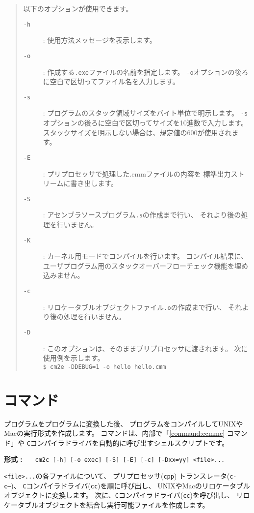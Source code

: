 \begin{quote}
\hspace{-1em}以下のオプションが使用できます。

\begin{description}
\item[{\tt -h}] : 使用方法メッセージを表示します。
\item[{\tt -o}] : 作成する{\tt .exe}ファイルの名前を指定します。
{\tt -o}オプションの後ろに空白で区切ってファイル名を入力します。
\item[{\tt -s}] : プログラムのスタック領域サイズをバイト単位で明示します。
{\tt -s}オプションの後ろに空白で区切ってサイズを10進数で入力します。
スタックサイズを明示しない場合は、規定値の600が使用されます。
\item[{\tt -E}] : プリプロセッサで処理した{.cmm}ファイルの内容を
標準出力ストリームに書き出します。
\item[{\tt -S}] : アセンブラソースプログラム{\tt .s}の作成まで行い、
それより後の処理を行いません。
\item[{\tt -K}] : {\tacos}カーネル用モードでコンパイルを行います。
コンパイル結果に、
ユーザプログラム用のスタックオーバーフローチェック機能を埋め込みません。
\item[{\tt -c}] : リロケータブルオブジェクトファイル{\tt .o}の作成まで行い、
それより後の処理を行いません。
\item[{\tt -D}] : このオプションは、そのままプリプロセッサに渡されます。
次に使用例を示します。\\
\verb/$ cm2e -DDEBUG=1 -o hello hello.cmm/
\end{description}
\end{quote}

\section{{\cmc}コマンド}

{\cmm}プログラムを{\cl}プログラムに変換した後、
{\cl}プログラムをコンパイルしてUNIXやMacの実行形式を作成します。
{\cmc}コマンドは、内部で「\ref{command:ccmmc} {\ccmmc}コマンド」や
{\tt C}コンパイラドライバを自動的に呼び出すシェルスクリプトです。

\begin{flushleft}
{\bf 形式 : }~~~\verb/cm2c [-h] [-o exec] [-S] [-E] [-c] [-Dxx=yy] <file>.../
\end{flushleft}

{\tt <file>...}の各ファイルについて、
プリプロセッサ({\tt cpp})
トランスレータ({\tt c-c--})、
{\tt C}コンパイラドライバ({\tt cc})を順に呼び出し、
UNIXやMacのリロケータブルオブジェクトに変換します。
次に、{\tt C}コンパイラドライバ({\tt cc})を呼び出し、
リロケータブルオブジェクトを結合し実行可能ファイルを作成します。

